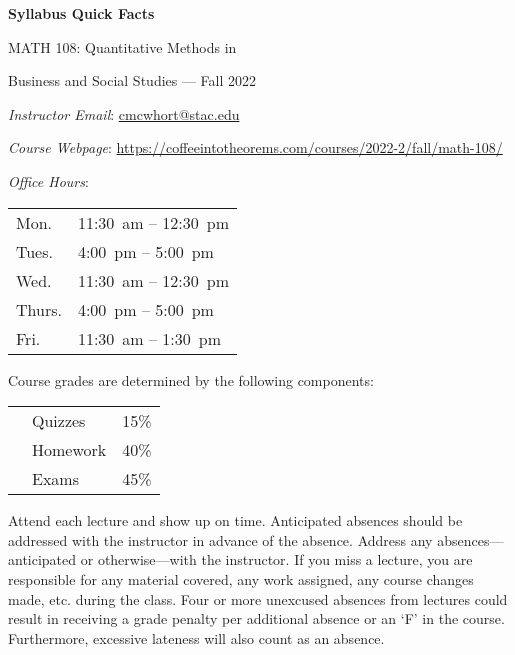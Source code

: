 \documentclass[11pt,letterpaper]{article}
\begin{document}
\begin{center} 
\bfseries
\color{stacred}
\LARGE Syllabus Quick Facts \par\vspace{0.2\baselineskip}
\Large MATH 108: Quantitative Methods in \par Business and Social Studies --- Fall 2022 
\end{center} \pspace


\hspace{0.53cm} {\itshape Instructor Email}: \href{mailto:cmcwhort@stac.edu}{cmcwhort@stac.edu} \par
\hspace{0.53cm} {\itshape Course Webpage}: \href{https://coffeeintotheorems.com/courses/2022-2/fall/math-108/}{https://coffeeintotheorems.com/courses/2022-2/fall/math-108/} \par
\hspace{0.53cm} {\itshape Office Hours}: 	\par \vspace{-0.3cm}
	\begin{table}[!ht]
	\centering
	\begin{tabular}{l || l}
	Mon. & 11:30~am -- 12:30~pm \\
	Tues. & 4:00~pm -- 5:00~pm \\
	Wed. & 11:30~am -- 12:30~pm \\
	Thurs. & 4:00~pm -- 5:00~pm \\
	Fri. & 11:30~am -- 1:30~pm
	\end{tabular}
	\end{table}


Course grades are determined by the following components: \par \vspace{-0.3cm}
	\begin{table}[!ht]
        \begin{tabular}{clr}
	& Quizzes & 15\% \\
	& Homework & 40\% \\
	& Exams & 45\%
        \end{tabular} 
        \end{table}


Attend each lecture and show up on time. Anticipated absences should be addressed with the instructor in advance of the absence. Address any absences---anticipated or otherwise---with the instructor. If you miss a lecture, you are responsible for any material covered, any work assigned, any course changes made, etc. during the class. Four or more unexcused absences from lectures could result in receiving a grade penalty per additional absence or an `F' in the course. Furthermore, excessive lateness will also count as an absence. \pspace
\end{document}
